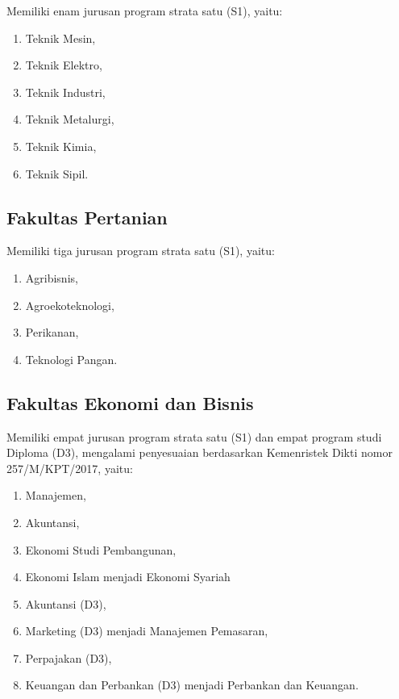 \documentclass[
]{book}
\providecommand{\tightlist}{%
  \setlength{\itemsep}{0pt}\setlength{\parskip}{0pt}}
\begin{document}
Memiliki enam jurusan program strata satu (S1), yaitu:

\begin{enumerate}
\def\labelenumi{\arabic{enumi}.}
\tightlist
\item
  Teknik Mesin,\\
\item
  Teknik Elektro,\\
\item
  Teknik Industri,\\
\item
  Teknik Metalurgi,
\item
  Teknik Kimia,
\item
  Teknik Sipil.
\end{enumerate}

\hypertarget{fakultas-pertanian}{%
\subsection{Fakultas Pertanian}\label{fakultas-pertanian}}

Memiliki tiga jurusan program strata satu (S1), yaitu:

\begin{enumerate}
\def\labelenumi{\arabic{enumi}.}
\tightlist
\item
  Agribisnis,\\
\item
  Agroekoteknologi,\\
\item
  Perikanan,
\item
  Teknologi Pangan.
\end{enumerate}

\hypertarget{fakultas-ekonomi-dan-bisnis}{%
\subsection{Fakultas Ekonomi dan Bisnis}\label{fakultas-ekonomi-dan-bisnis}}

Memiliki empat jurusan program strata satu (S1) dan empat program studi Diploma (D3), mengalami penyesuaian berdasarkan Kemenristek Dikti nomor 257/M/KPT/2017, yaitu:

\begin{enumerate}
\def\labelenumi{\arabic{enumi}.}
\tightlist
\item
  Manajemen,
\item
  Akuntansi,
\item
  Ekonomi Studi Pembangunan,
\item
  Ekonomi Islam menjadi Ekonomi Syariah
\item
  Akuntansi (D3),\\
\item
  Marketing (D3) menjadi Manajemen Pemasaran,\\
\item
  Perpajakan (D3),
\item
  Keuangan dan Perbankan (D3) menjadi Perbankan dan Keuangan.
\end{enumerate}
\end{document}
